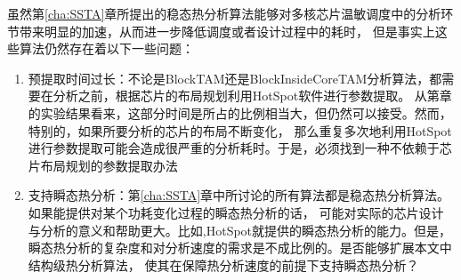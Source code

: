 虽然第\ref{cha:SSTA}章所提出的稳态热分析算法能够对多核芯片温敏调度中的分析环节带来明显的加速，从而进一步降低调度或者设计过程中的耗时， 但是事实上这些算法仍然存在着以下一些问题：
\begin{enumerate}[1)]
\item 预提取时间过长：不论是BlockTAM还是BlockInsideCoreTAM分析算法，都需要在分析之前，根据芯片的布局规划利用HotSpot软件进行参数提取。 从第章的实验结果看来，这部分时间是所占的比例相当大，但仍然可以接受。然而，特别的，如果所要分析的芯片的布局不断变化， 那么重复多次地利用HotSpot进行参数提取可能会造成很严重的分析耗时。于是，必须找到一种不依赖于芯片布局规划的参数提取办法
\item 支持瞬态热分析：第\ref{cha:SSTA}章中所讨论的所有算法都是稳态热分析算法。如果能提供对某个功耗变化过程的瞬态热分析的话， 可能对实际的芯片设计与分析的意义和帮助更大。比如,HotSpot就提供的瞬态热分析的能力。但是， 瞬态热分析的复杂度和对分析速度的需求是不成比例的。是否能够扩展本文中结构级热分析算法， 使其在保障热分析速度的前提下支持瞬态热分析？
\end{enumerate}


